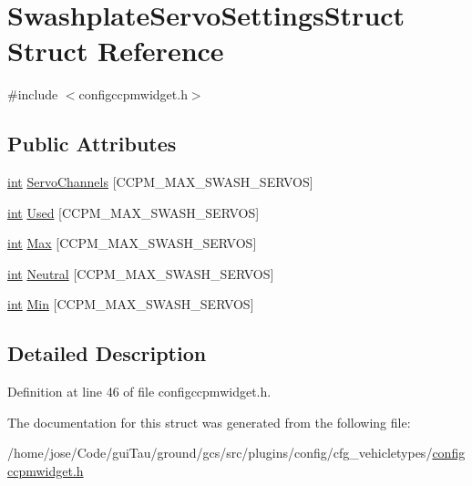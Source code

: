 \hypertarget{struct_swashplate_servo_settings_struct}{\section{Swashplate\-Servo\-Settings\-Struct Struct Reference}
\label{struct_swashplate_servo_settings_struct}
}


{\ttfamily \#include $<$configccpmwidget.\-h$>$}

\subsection*{Public Attributes}
\begin{DoxyCompactItemize}
\item 
\hyperlink{ioapi_8h_a787fa3cf048117ba7123753c1e74fcd6}{int} \hyperlink{group___config_plugin_ga86e55bfb2e22af5cf453931b3990d504}{Servo\-Channels} \mbox{[}C\-C\-P\-M\-\_\-\-M\-A\-X\-\_\-\-S\-W\-A\-S\-H\-\_\-\-S\-E\-R\-V\-O\-S\mbox{]}
\item 
\hyperlink{ioapi_8h_a787fa3cf048117ba7123753c1e74fcd6}{int} \hyperlink{group___config_plugin_ga9fda1ee21effccd7fcbad04816734eac}{Used} \mbox{[}C\-C\-P\-M\-\_\-\-M\-A\-X\-\_\-\-S\-W\-A\-S\-H\-\_\-\-S\-E\-R\-V\-O\-S\mbox{]}
\item 
\hyperlink{ioapi_8h_a787fa3cf048117ba7123753c1e74fcd6}{int} \hyperlink{group___config_plugin_ga30259c7dfef707f2d0999fed8adaf6b1}{Max} \mbox{[}C\-C\-P\-M\-\_\-\-M\-A\-X\-\_\-\-S\-W\-A\-S\-H\-\_\-\-S\-E\-R\-V\-O\-S\mbox{]}
\item 
\hyperlink{ioapi_8h_a787fa3cf048117ba7123753c1e74fcd6}{int} \hyperlink{group___config_plugin_gad228ac505087eafb0d00d4aab3b3e76d}{Neutral} \mbox{[}C\-C\-P\-M\-\_\-\-M\-A\-X\-\_\-\-S\-W\-A\-S\-H\-\_\-\-S\-E\-R\-V\-O\-S\mbox{]}
\item 
\hyperlink{ioapi_8h_a787fa3cf048117ba7123753c1e74fcd6}{int} \hyperlink{group___config_plugin_ga68b64812e9062f2c280eebb8ad8961c4}{Min} \mbox{[}C\-C\-P\-M\-\_\-\-M\-A\-X\-\_\-\-S\-W\-A\-S\-H\-\_\-\-S\-E\-R\-V\-O\-S\mbox{]}
\end{DoxyCompactItemize}


\subsection{Detailed Description}


Definition at line 46 of file configccpmwidget.\-h.



The documentation for this struct was generated from the following file\-:\begin{DoxyCompactItemize}
\item 
/home/jose/\-Code/gui\-Tau/ground/gcs/src/plugins/config/cfg\-\_\-vehicletypes/\hyperlink{configccpmwidget_8h}{configccpmwidget.\-h}\end{DoxyCompactItemize}
